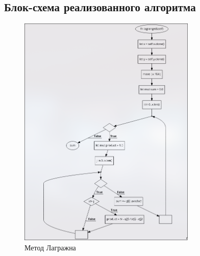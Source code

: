 \documentclass{article}
\begin{document}
            \subsection{Блок-схема реализованного алгоритма}
                  \begin{figure}[H]
                        \centering
                        \includegraphics[width=240pt]{alg1.png}
                        \caption[Схема-1]{Метод Лагражна}
                        \label{fig:screenshot001}
                  \end{figure}
\end{document}
